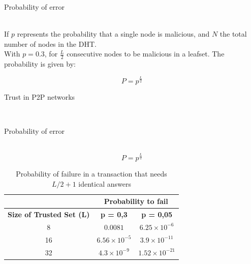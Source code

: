 \documentclass[12pt]{beamer}
\renewcommand{\frametitle}[1]{\vspace{0.2cm}\begin{huge}#1\end{huge}\\}
\renewcommand{\framesubtitle}[1]{\vspace{0.4cm} \hspace{0.4cm}\begin{large}#1\end{large}\\}
\begin{document}
  \begin{frame}
  \frametitle{Probability of error}

      If $p$ represents the probability that a single node is malicious, and
      $N$ the total number of nodes in the DHT.\\

      With $p= 0.3$, for   
      $\frac{L}{2}$ consecutive nodes to be malicious in a leafset. The
probability is given by:

  \begin{equation} \label{eq:p_leafset}
    P= p^{\frac{L}{2}}
  \end{equation}

  \end{frame}

  \begin{frame}
  \frametitle{Trust in P2P networks}
  \framesubtitle{Probability of error}

  \begin{equation} \label{eq:p_leafset}
    P= p^{\frac{L}{2}}
  \end{equation}

  \begin{table}
    \centering
    \footnotesize
    \begin{tabular}{|c|c|c|}
      \cline{2-3}
      \multicolumn{1}{c|}{}&  \multicolumn{2}{c|}{\textbf{Probability to fail}} \\ \cline{2-3}
      \hline
      \textbf{Size of Trusted Set (L)} & \textbf{p = 0,3} & \textbf{p = 0,05} \\
      \hline \hline
      8 &  $0.0081$              & $6.25 \times 10^{-6}$  \\
      \hline
      16 & $6.56 \times 10^{-5}$ & $ 3.9 \times 10^{-11}$ \\
      \hline
      32 & $4.3 \times 10^{-9}$  & $ 1.52 \times 10^{-21} $  \\
      \hline
    \end{tabular}
    \caption{Probability of failure in a transaction that needs $L/2+1$
identical answers}
    \label{tab:p_leafset}
  \end{table}

  \end{frame}
  
\end{document}

